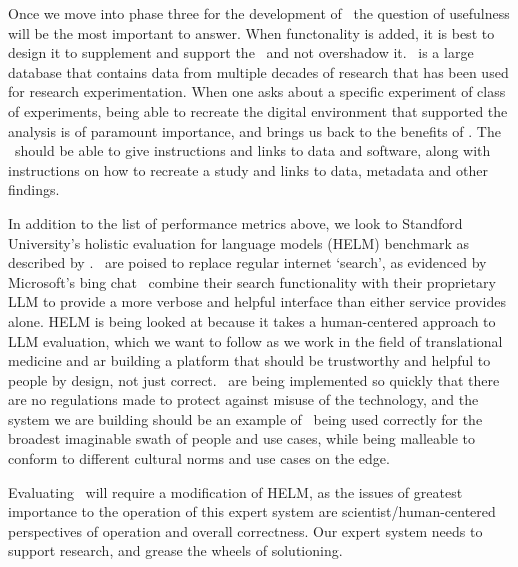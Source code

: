 Once we move into phase three for the development of \project\ the question of usefulness will be the most important to answer.
When functonality is added, it is best to design it to supplement and support the \project\ and not overshadow it.
\GN\ is a large database that contains data from multiple decades of research that has been used for research experimentation.
When one asks about a specific experiment of class of experiments, being able to recreate the digital environment that supported the analysis is of paramount importance, and brings us back to the benefits of \guix.
The \project\ should be able to give instructions and links to data and software, along with instructions on how to recreate a study and links to data, metadata and other findings.

In addition to the list of performance metrics above, we look to Standford University's holistic evaluation for language models (HELM) benchmark as described by \cite{Liang:2022:helm}.
\llms\ are poised to replace regular internet `search', as evidenced by Microsoft's bing chat~\cite{BingChat:2023} combine their search functionality with their proprietary LLM to provide a more verbose and helpful interface than either service provides alone.
HELM is being looked at because it takes a human-centered approach to LLM evaluation, which we want to follow as we work in the field of translational medicine and ar building a platform that should be trustworthy and helpful to people by design, not just correct.
\llms\ are being implemented so quickly that there are no regulations made to protect against misuse of the technology, and the system we are building should be an example of \llms\ being used correctly for the broadest imaginable swath of people and use cases, while being malleable to conform to different cultural norms and use cases on the edge.

Evaluating \project\ will require a modification of HELM, as the issues of greatest importance to the operation of this expert system are scientist/human-centered perspectives of operation and overall correctness.
Our expert system needs to support research, and grease the wheels of solutioning.


